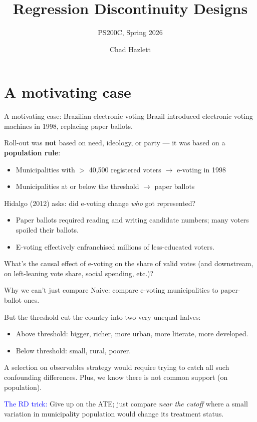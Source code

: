 \documentclass[xcolor=dvipsnames]{beamer}
\title[]{Regression Discontinuity Designs}
\subtitle[ ]{PS200C, Spring 2026}
\author[Hazlett]{Chad Hazlett}
\institute[UCLA]{UCLA\\[1ex]
  \texttt{chazlett@ucla.edu}
}
\date{}
\begin{document}
\begin{frame}
  \titlepage
\end{frame}


\section{A motivating case}

\begin{frame}{A motivating case: Brazilian electronic voting}
\small
{} Brazil introduced electronic voting machines in 1998, replacing paper ballots. \medskip

 Roll-out was \textbf{not} based on need, ideology, or party --- it was based on a \textbf{population rule}: \\
\smallskip
\begin{itemize}
  \item Municipalities with $>$ 40,500 registered voters $\rightarrow$ e-voting in 1998
  \item Municipalities at or below the threshold $\rightarrow$ paper ballots
\end{itemize}
\medskip
{} Hidalgo (2012) asks: did e-voting change \textit{who} got represented?
\smallskip
\begin{itemize}
  \item Paper ballots required reading and writing candidate numbers; many voters spoiled their ballots.
  \item E-voting effectively enfranchised millions of less-educated voters.
\end{itemize}
\medskip
{} What's the causal effect of e-voting on the share of valid votes (and downstream, on left-leaning vote share, social spending, etc.)?
\end{frame}


\begin{frame}{Why we can't just compare}
\small
{} Naive: compare e-voting municipalities to paper-ballot ones. \medskip

 But the threshold cut the country into two very unequal halves: \\
\smallskip
\begin{itemize}
  \item Above threshold: bigger, richer, more urban, more literate, more developed.
  \item Below threshold: small, rural, poorer.
\end{itemize}
\medskip
{} A selection on observables strategy would require trying to catch all such confounding differences. Plus, we know there is not common support (on population). \medskip

 \textcolor{Blue}{The RD trick:} Give up on the ATE; just compare \textit{near the cutoff} where a small variation in municipality population would change its treatment status. 
\end{frame}
\end{document}
